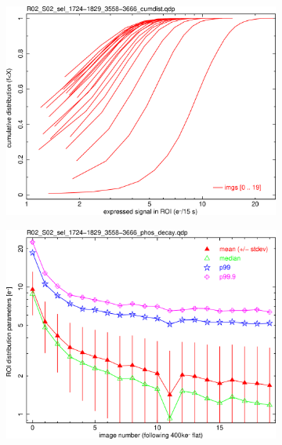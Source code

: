 \begin{figure}[!htbp]
\begin{subfigure}{0.45\textwidth}    
  \centering
  \includegraphics[width=\textwidth]{figures/phosphorescence-survey/phos_kinetics/R02_S02_sel_1724-1829_3558-3666_cumdist.png}    
\end{subfigure}
\hfil
\begin{subfigure}{0.45\textwidth}
  \centering
  \includegraphics[width=\textwidth]{figures/phosphorescence-survey/phos_kinetics/R02_S02_sel_1724-1829_3558-3666_phos_decay.png}
\end{subfigure}
\newline
\begin{subfigure}{0.45\textwidth}    

\end{subfigure}
\end{figure}
